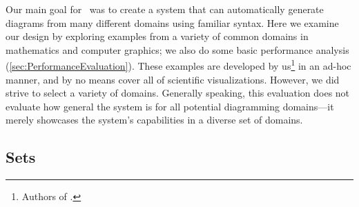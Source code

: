 

Our main goal for \Penrose\ was to create a system that can automatically generate diagrams from many different domains using familiar syntax. Here we examine our design by exploring examples from a variety of common domains in mathematics and computer graphics; we also do some basic performance analysis (\cref{sec:PerformanceEvaluation}). These examples are developed by us\footnote{Authors of \cite{penrose}.} in an ad-hoc manner, and by no means cover all of scientific visualizations. However, we did strive to select a variety of domains. Generally speaking, this evaluation does not evaluate how general the system is for all potential diagramming domains---it merely showcases the system's capabilities in a diverse set of domains. 





\subsection{Sets}
\label{sec:Sets}

